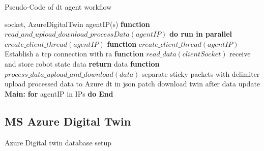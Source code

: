 \begin{breakablealgorithm}
    \caption{Pseudo-Code of \gls{dt} agent workflow}
    \label{alg:DTAgentPseudoCode}
    \begin{algorithmic}
     socket, AzureDigitalTwin
     agentIP(s)
    \State \textbf{function} {$read\_and\_upload\_download\_processData(agentIP)$}
        \State \qquad \textbf{do run in parallel}
            \State \qquad \qquad $create\_client\_thread(agentIP)$       
    \State \textbf{function} {$create\_client\_thread(agentIP)$}
        \State \qquad Establish a \gls{tcp} connection with \gls{ra}
        \State {}  
        \State {}    
    \State \textbf{function} {$read\_data(clientSocket)$}
        \State \qquad receive and store robot state data
        \State \qquad \textbf{return} data
    \State \textbf{function} {$process\_data\_upload\_and\_download(data)$}
        \State \qquad separate sticky packets with delimiter
        \State \qquad upload processed data to Azure \gls{dt} in json patch
        \State \qquad download twin after data update 
    \State \textbf{Main:}
        \State \qquad \textbf{for} agentIP in IPs \textbf{do}
        \State \qquad {}
        \State \textbf{End}
    \end{algorithmic}
\end{breakablealgorithm}



\subsection{MS Azure Digital Twin}
Azure Digital twin database setup